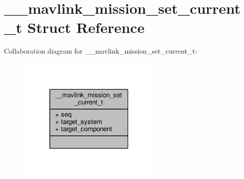 \hypertarget{struct____mavlink__mission__set__current__t}{\section{\+\_\+\+\_\+mavlink\+\_\+mission\+\_\+set\+\_\+current\+\_\+t Struct Reference}
\label{struct____mavlink__mission__set__current__t}
}


Collaboration diagram for \+\_\+\+\_\+mavlink\+\_\+mission\+\_\+set\+\_\+current\+\_\+t\+:
\nopagebreak
\begin{figure}[H]
\begin{center}
\leavevmode
\includegraphics[width=199pt]{struct____mavlink__mission__set__current__t__coll__graph}
\end{center}
\end{figure}
